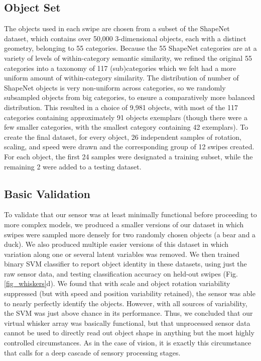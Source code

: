 \subsection{Object Set}
The objects used in each swipe are chosen from a subset of the ShapeNet~\cite{Chang2015} dataset, which contains over 50,000 3-dimensional objects, each with a distinct geometry, belonging to 55 categories.
Because the 55 ShapeNet categories are at a variety of levels of within-category semantic similarity, we refined the original 55 categories into a taxonomy of 117 (sub)categories which we felt had a more uniform amount of within-category similarity. 
The distribution of number of ShapeNet objects is very non-uniform across categories, so we randomly subsampled objects from big categories, to ensure a comparatively more balanced distribution.  
This resulted in a choice of 9,981 objects, with most of the 117 categories containing approximately 91 objects exemplars (though there were a few smaller categories, with the smallest category containing 42 exemplars).
To create the final dataset, for every object, 26 independent samples of rotation, scaling, and speed were drawn and the corresponding group of 12 swipes created.   
For each object, the first 24 samples were designated a training subset, while the remaining 2 were added to a testing dataset. 


\subsection{Basic Validation}
To validate that our sensor was at least minimally functional before proceeding to more complex models, we produced a smaller versions of our dataset in which swipes were sampled more densely for two randomly chosen objects (a bear and a duck).  
We also produced multiple easier versions of this dataset in which variation along one or several latent variables was removed. 
We then trained binary SVM classifier to report object identity in these datasets, using just the raw sensor data, and testing classification accuracy on held-out swipes (Fig. \ref{fig_whiskers}d).  We found that with scale and object rotation variability suppressed (but with speed and position variability retained), the sensor was able to nearly perfectly identify the objects.  
However, with all sources of variability, the SVM was just above chance in its performance.  
Thus, we concluded that our virtual whisker array was basically functional, but that unprocessed sensor data cannot be used to directly read out object shape in anything but the most highly controlled circumstances.
As in the case of vision, it is exactly this circumstance that calls for a deep cascade of sensory processing stages. 

